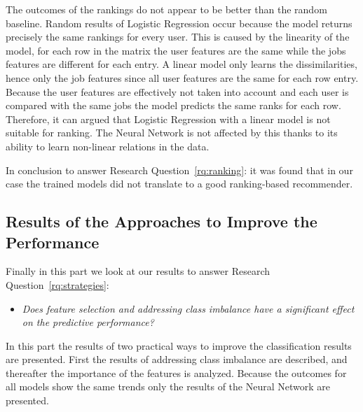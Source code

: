 The outcomes of the rankings do not appear to be better than the random baseline.
Random results of Logistic Regression occur because the model returns precisely the same rankings for every user.
This is caused by the linearity of the model, for each row in the matrix the user features are the same while the jobs features are different for each entry.
A linear model only learns the dissimilarities, hence only the job features since all user features are the same for each row entry. 
Because the user features are effectively not taken into account and each user is compared with the same jobs the model predicts the same ranks for each row.
Therefore, it can argued that Logistic Regression with a linear model is not suitable for ranking.
The Neural Network is not affected by this thanks to its ability to learn non-linear relations in the data. 

In conclusion to answer Research Question~\ref{rq:ranking}: it was found that in our case the trained models did not translate to a good ranking-based recommender.

\subsection{Results of the Approaches to Improve the Performance}
\label{ssec:ir}

Finally in this part we look at our results to answer Research Question~\ref{rq:strategies}:
\begin{itemize}
	\item[] \em Does feature selection and addressing class imbalance have a significant effect on the predictive performance?
\end{itemize}

\noindent In this part the results of two practical ways to improve the classification results are presented. 
First the results of addressing class imbalance are described, and thereafter the importance of the features is analyzed. 
Because the outcomes for all models show the same trends only the results of the Neural Network are presented.

